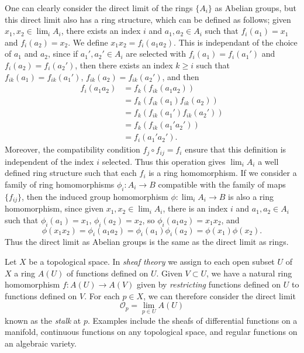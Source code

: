 One can clearly consider the direct limit of the rings $\{ A_i \}$ as Abelian groups, but this direct limit also has a ring structure, which can be defined as follows; given $x_1, x_2 \in \lim_i A_i$, there exists an index $i$ and $a_1, a_2 \in A_i$ such that $f_i(a_1) = x_1$ and $f_i(a_2) = x_2$. We define $x_1x_2 = f_i(a_1a_2)$. This is independant of the choice of $a_1$ and $a_2$, since if $a_1', a_2' \in A_i$ are selected with $f_i(a_1) = f_i(a_1')$ and $f_i(a_2) = f_i(a_2')$, then there exists an index $k \geq i$ such that $f_{ik}(a_1) = f_{ik}(a_1')$, $f_{ik}(a_2) = f_{ik}(a_2')$, and then
%
\begin{align*}
    f_i(a_1a_2) &= f_k(f_{ik}(a_1a_2))\\
    &= f_k(f_{ik}(a_1) f_{ik}(a_2))\\
    &= f_k(f_{ik}(a_1') f_{ik}(a_2'))\\
    &= f_k(f_{ik}(a_1'a_2'))\\
    &= f_i(a_1'a_2').
\end{align*}
%
Moreover, the compatibility condition $f_j \circ f_{ij} = f_i$ ensure that this definition is independent of the index $i$ selected. Thus this operation gives $\lim_i A_i$ a well defined ring structure such that each $f_i$ is a ring homomorphism. If we consider a family of ring homomorphisms $\phi_i: A_i \to B$ compatible with the family of maps $\{ f_{ij} \}$, then the induced group homomorphism $\phi: \lim_i A_i \to B$ is also a ring homomorphism, since given $x_1,x_2 \in \lim_i A_i$, there is an index $i$ and $a_1,a_2 \in A_i$ such that $\phi_i(a_1) = x_1$, $\phi_i(a_2) = x_2$, so $\phi_i(a_1a_2) = x_1x_2$, and
%
\[ \phi(x_1x_2) = \phi_i(a_1a_2) = \phi_i(a_1) \phi_i(a_2) = \phi(x_1) \phi(x_2). \]
%
Thus the direct limit as Abelian groups is the same as the direct limit as rings.

\begin{example}
    Let $X$ be a topological space. In \emph{sheaf theory} we assign to each open subset $U$ of $X$ a ring $A(U)$ of functions defined on $U$. Given $V \subset U$, we have a natural ring homomorphism $f: A(U) \to A(V)$ given by \emph{restricting} functions defined on $U$ to functions defined on $V$. For each $p \in X$, we can therefore consider the direct limit
    \[ \mathcal{O}_p = \lim_{p \in U} A(U) \]
    known as the \emph{stalk} at $p$. Examples include the sheafs of differential functions on a manifold, continuous functions on any topological space, and regular functions on an algebraic variety.
\end{example}

